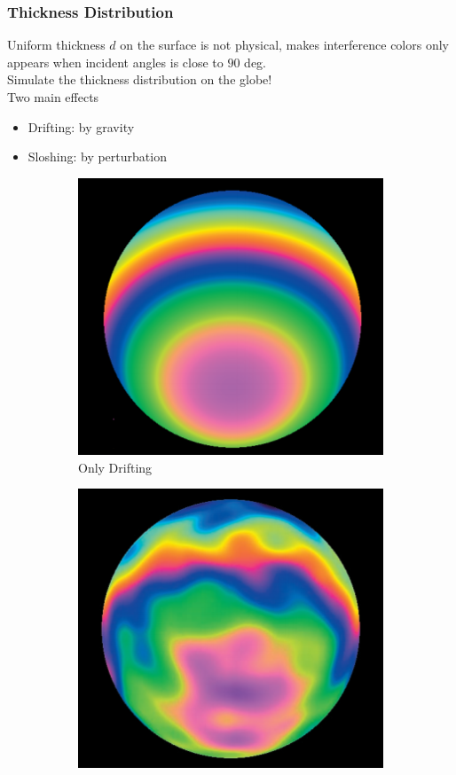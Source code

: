 \documentclass{beamer}
\begin{document}
\begin{frame}
	\frametitle{Thickness Distribution}
	Uniform thickness $d$ on the surface is not physical, makes interference colors only appears when incident angles is close to $90$ deg.\\
	Simulate the thickness distribution on the globe!\\
	Two main effects
	\begin{itemize}
		\item Drifting: by gravity
		\item Sloshing: by perturbation
	\end{itemize}
	\begin{figure}
    \centering
	\begin{subfigure}[b]{0.2\textwidth}
		\includegraphics[width=\textwidth]{thickness_drifting.png}
		\caption{\footnotesize Only Drifting}
	\end{subfigure}
	\quad\quad
	\begin{subfigure}[b]{0.2\textwidth}
		\includegraphics[width=\textwidth]{thickness_sloshing.png}

\end{subfigure}
\end{figure}
\end{frame}
\end{document}
